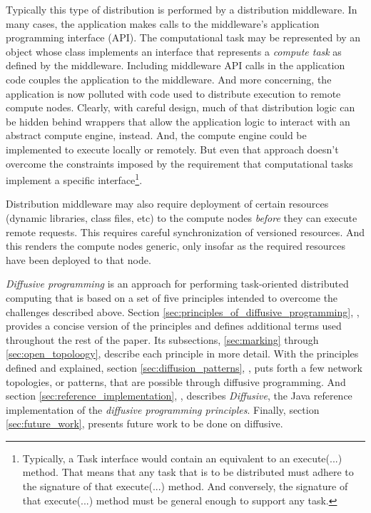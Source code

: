\documentclass[11pt]{article}
\begin{document}
Typically this type of distribution is performed by a distribution middleware. In many cases, the application makes calls to the middleware's application programming interface (API). The computational task may be represented by an object whose class implements an interface that represents a \emph{compute task} as defined by the middleware. Including middleware API calls in the application code couples the application to the middleware. And more concerning, the application is now polluted with code used to distribute execution to remote compute nodes. Clearly, with careful design, much of that distribution logic can be hidden behind wrappers that allow the application logic to interact with an abstract compute engine, instead. And, the compute engine could be implemented to execute locally or remotely. But even that approach doesn't overcome the constraints imposed by the requirement that computational tasks implement a specific interface\footnote{Typically, a \textsf{Task} interface would contain an equivalent to an \textsf{execute(...)} method. That means that any task that is to be distributed must adhere to the signature of that \textsf{execute(...)} method. And conversely, the signature of that \textsf{execute(...)} method must be general enough to support any task.}.

Distribution middleware may also require deployment of certain resources (dynamic libraries, class files, etc) to the compute nodes \emph{before} they can execute remote requests. This requires careful synchronization of versioned resources. And this renders the compute nodes generic, only insofar as the required resources have been deployed to that node.

\emph{Diffusive programming} is an approach for performing task-oriented distributed computing that is based on a set of five principles intended to overcome the challenges described above. Section \ref{sec:principles_of_diffusive_programming}, \textit{}, provides a concise version of the principles and defines additional terms used throughout the rest of the paper. Its subsections, \ref{sec:marking} through \ref{sec:open_topoloogy}, describe each principle in more detail. With the principles defined and explained, section \ref{sec:diffusion_patterns}, \textit{}, puts forth a few network topologies, or patterns, that are possible through diffusive programming. And section \ref{sec:reference_implementation}, \textit{}, describes \emph{Diffusive}, the Java reference implementation of the \emph{diffusive programming principles}. Finally, section \ref{sec:future_work}, presents future work to be done on diffusive.
\end{document}
